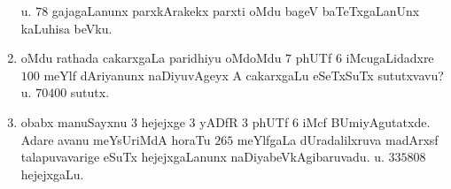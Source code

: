 \begin{enumerate}[\rm(1)]
\hfill u. $78$ gajagaLanunx parxkArakekx parxti oMdu bageV baTeTxgaLanUnx kaLuhisa beVku.

\item oMdu rathada cakarxgaLa paridhiyu oMdoMdu $7$ phUTf $6$ iMcugaLidadxre $100$ meYlf dAriyanunx naDiyuvAgeyx A cakarxgaLu eSeTxSuTx sututxvavu? \hfill u. $70400$ sututx.

\item obabx manuSayxnu $3$ hejejxge $3$ yADfR $3$ phUTf $6$ iMcf BUmiyAgutatxde. Adare avanu meYsUriMdA horaTu $265$ meYlfgaLa dUradalilxruva madArxsf talapuvavarige eSuTx hejejxgaLanunx naDiyabeVkAgibaruvadu. \hfill u. $335808$ hejejxgaLu.
\end{enumerate}
